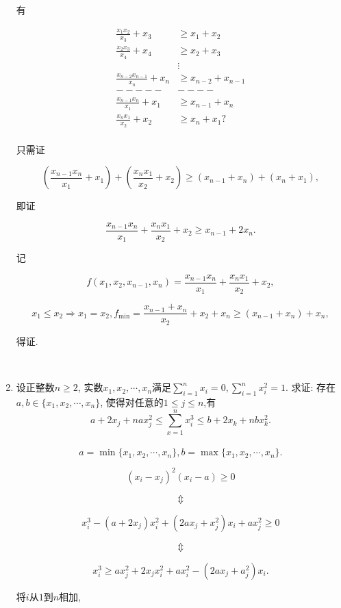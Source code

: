 \documentclass[8pt]{article}
\begin{document}
\begin{enumerate}
			有

			\begin{align*}
				\frac{x_1 x_2}{x_3} + x_3 &\geq x_1 + x_2\\
				\frac{x_2 x_3}{x_4} + x_4 &\geq x_2 + x_3\\
				&\vdots\\
				\frac{x_{n-2} x_{n-1}}{x_n} + x_n &\geq x_{n-2} + x_{n-1}\\
				-----&----\\
				\frac{x_{n-1} x_n}{x_1} + x_1 &\geq x_{n-1} + x_n\\
				\frac{x_n x_1}{x_2} + x_2 &\geq x_n + x_1 ?\\
			\end{align*}

			只需证

			$$\left(\frac{x_{n-1} x_n}{x_1} + x_1\right) + \left(\frac{x_n x_1}{x_2} + x_2\right) \geq (x_{n-1} + x_n) + (x_n + x_1),$$

			即证

			$$\frac{x_{n-1}x_n}{x_1} + \frac{x_n x_1}{x_2} + x_2 \geq x_{n-1} + 2x_n.$$

			记

			$$f(x_1, x_2, x_{n-1}, x_n) = \frac{x_{n-1} x_n}{x_1} + \frac{x_n x_1}{x_2} + x_2,$$

			$$x_1 \leq x_2 \Rightarrow x_1=x_2, f_{\min}=\frac{x_{n-1}+x_n}{x_2} + x_2 + x_n \geq (x_{n-1} + x_n) + x_n,$$

			得证.

		~\\

		\item 设正整数$n\geq 2$, 实数$x_1, x_2, \cdots, x_n$满足$\displaystyle \sum_{i=1}^{n} x_i = 0, \sum_{i=1}^{n} x_i^2 = 1$. 求证: 存在$a, b \in \{x_1, x_2, \cdots, x_n \}$, 使得对任意的$1\leq j\leq n$,有$$a+2x_j+nax_j^2\leq\sum_{x=1}^{n}x_i^3\leq b+2x_k+nbx_k^2.$$
			~\\

			$$a=\min \{x_1, x_2, \cdots, x_n\}, b=\max \{x_1, x_2, \cdots, x_n\}.$$

			$$(x_i-x_j)^2 (x_i-a) \geq 0$$

			$$\Updownarrow$$

			$$x_i^3 - (a + 2x_j)x_i^2 + (2ax_j + x_j^2 ) x_i + ax_j^2 \geq 0$$

			$$\Updownarrow$$

			$$x_i^3\geq ax_j^2 + 2x_j x_i^2 + ax_i^2 - (2ax_j + a_j^2)x_i.$$

			将$i$从$1$到$n$相加,


\end{enumerate}
\end{document}

